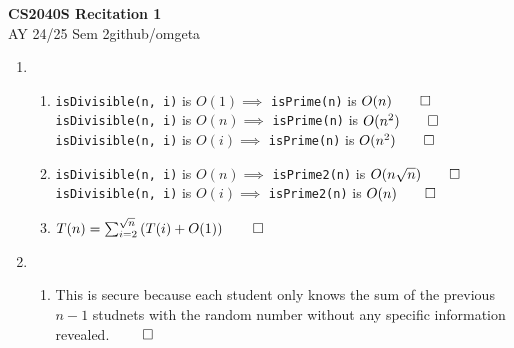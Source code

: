 \documentclass[12pt, a4paper]{article}
\newcommand{\mytitle}{CS2040S Recitation 1}
\newcommand{\myauthor}{github/omgeta}
\newcommand{\mydate}{AY 24/25 Sem 2}
\begin{document}
\raggedright
\footnotesize
\begin{center}
{\normalsize{\textbf{\mytitle}}} \\
{\footnotesize{\mydate\hspace{2pt}\textemdash\hspace{2pt}\myauthor}}
\end{center}
\begin{enumerate}[Q\arabic*.]
  \item 
    \begin{enumerate}[(\alph*.)]
      \item \lstinline|isDivisible(n, i)| is $O(1) \implies$ \lstinline|isPrime(n)| is $O(n) \qed$\\ 
      \lstinline|isDivisible(n, i)| is $O(n) \implies$ \lstinline|isPrime(n)| is $O(n^2) \qed$\\ 
      \lstinline|isDivisible(n, i)| is $O(i) \implies$ \lstinline|isPrime(n)| is $O(n^2) \qed$ 

      \item \lstinline|isDivisible(n, i)| is $O(n) \implies$ \lstinline|isPrime2(n)| is $O(n\sqrt{n}) \qed$\\ 
        \lstinline|isDivisible(n, i)| is $O(i) \implies$ \lstinline|isPrime2(n)| is $O(n) \qed$\\ 

      \item $T(n) = \sum^{\sqrt{n}}_{i=2}\left(T(i) + O(1)\right) \qed$ 
    \end{enumerate}

  \item 
    \begin{enumerate}[(\alph*.)]
      \item 
        This is secure because each student only knows the sum of the previous $n-1$ studnets with the random number without any specific information revealed. $\qed$


\end{enumerate}
\end{enumerate}
\end{document}
